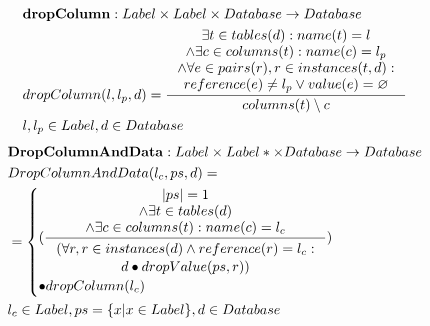 \documentclass[11pt]{article}
\begin{document}
\begin{align*}
&	\mathbf{dropColumn} : Label \times Label \times Database \rightarrow Database \\
& 	dropColumn(l, l_p, d) = \inference{ \exists t \in tables(d) : name(t) = l \\ \wedge \exists c \in columns(t) : name(c) = l_p \\ \wedge \forall e \in  pairs(r), r \in instances(t, d) : \\ reference(e) \neq l_p \vee value(e) = \varnothing  }{columns(t) \setminus c}\\
&	 l , l_p\in Label, d \in Database 
\end{align*}
\begin{align*}
&	\mathbf{DropColumnAndData} : Label \times Label* \times Database \rightarrow Database \\
&	DropColumnAndData(l_c, ps, d) = \\
&= \begin{cases}
 	(\inference{|ps| = 1 \\ \wedge \exists t \in tables(d) \\ \wedge \exists c \in columns(t) : name(c) = l_c}{\begin{gathered}
	 	(\forall r, r \in instances(d) \wedge reference(r) = l_c: \\d \bullet dropValue(ps, r)) \end{gathered}}) \\ \bullet dropColumn(l_c)  
 \end{cases}
	\\
&	l_c \in Label, ps = \{ x | x \in Label\}, d \in Database
\end{align*}
\end{document}
